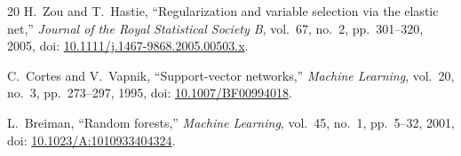 \documentclass[conference]{IEEEtran}
\begin{document}
\begin{thebibliography}{20}
H.~Zou and T.~Hastie,
``Regularization and variable selection via the elastic net,''
\textit{Journal of the Royal Statistical Society B}, vol.~67, no.~2,
pp.~301--320, 2005, doi: \url{10.1111/j.1467-9868.2005.00503.x}.

C.~Cortes and V.~Vapnik,
``Support-vector networks,''
\textit{Machine Learning}, vol.~20, no.~3, pp.~273--297, 1995,
doi: \url{10.1007/BF00994018}.

L.~Breiman,
``Random forests,''
\textit{Machine Learning}, vol.~45, no.~1, pp.~5--32, 2001,
doi: \url{10.1023/A:1010933404324}.

\end{thebibliography}
\end{document}
